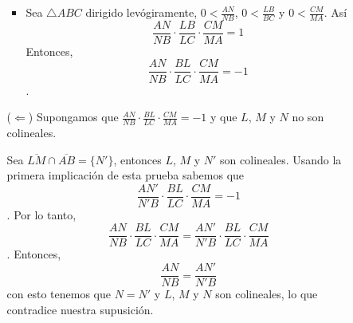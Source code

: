 \begin{dem}
\begin{enumerate}
\begin{itemize}
\begin{itemize}
\item Sea $\triangle ABC$ dirigido levógiramente, $0<\frac{AN}{NB}$, $0<\frac{LB}{BC}$ y $0<\frac{CM}{MA}$. Así
$$\frac{AN}{NB}\cdot\frac{LB}{LC}\cdot\frac{CM}{MA}=1$$
Entonces,
$$\frac{AN}{NB}\cdot\frac{BL}{LC}\cdot\frac{CM}{MA}=-1$$.
\end{itemize}

\item[($\Leftarrow$)] Supongamos que $\frac{AN}{NB}\cdot\frac{BL}{LC}\cdot\frac{CM}{MA}=-1$ y que $L$, $M$ y $N$ no son colineales.

Sea $\overline{LM}\cap\overline{AB}=\{N'\}$, entonces $L$, $M$ y $N'$ son colineales. Usando la primera implicación de esta prueba sabemos que 
$$\frac{AN'}{N'B}\cdot\frac{BL}{LC}\cdot\frac{CM}{MA}=-1$$.
Por lo tanto,
$$\frac{AN}{NB}\cdot\frac{BL}{LC}\cdot\frac{CM}{MA}=\frac{AN'}{N'B}\cdot\frac{BL}{LC}\cdot\frac{CM}{MA}$$.
Entonces, $$\frac{AN}{NB}=\frac{AN'}{N'B}$$
con esto tenemos que $N=N'$ y $L$, $M$ y $N$ son colineales, lo que contradice nuestra supusición. 

\end{itemize}
\end{enumerate}
\end{dem}


